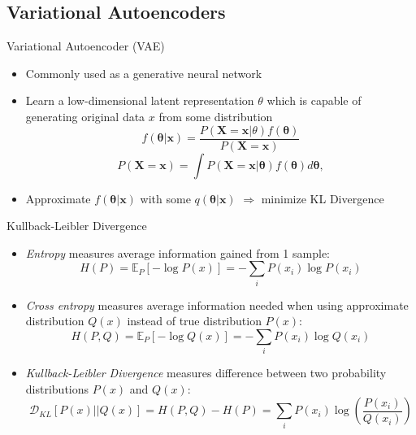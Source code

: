 \documentclass{beamer}
\theoremstyle{definition}
\begin{document}
\subsection{Variational Autoencoders}
\begin{frame}{Variational Autoencoder (VAE)}
\begin{itemize}
\item Commonly used as a generative neural network
\item Learn a low-dimensional latent representation $\theta$ which is capable of generating original data $x$ from some distribution
\[
f(\boldsymbol{\theta} | \boldsymbol{x})=\frac{P(\boldsymbol{X}=\boldsymbol{x}| \theta) f(\boldsymbol{\theta})}{P(\boldsymbol{X}=\boldsymbol{x})}
\]
\begin{equation}\label{marginal}
{P(\boldsymbol{X}=\boldsymbol{x})=\int P(\boldsymbol{X}=\boldsymbol{x}| \boldsymbol{\theta}) f(\boldsymbol{\theta})d\boldsymbol{\theta}},\nonumber
\end{equation}
\item<2-> Approximate $f(\boldsymbol{\theta} | \boldsymbol{x})$ with some $q(\boldsymbol{\theta} | \boldsymbol{x})$ $\Rightarrow$ minimize KL Divergence
\end{itemize}
\end{frame}

\begin{frame}{Kullback-Leibler Divergence}
\begin{itemize}
  \item<1-> \textit{Entropy} measures average information gained from 1 sample:
  \[H(P) = \mathbb{E}_P[-\log P(x)] =  - \sum_i P(x_i) \log P(x_i)\]
  \item<2-> \textit{Cross entropy} measures average information needed when using approximate distribution $Q(x)$ instead of true distribution $P(x)$:
  \[H(P,Q) = \mathbb{E}_P[-\log Q(x)] = -\sum_i P(x_i) \log Q(x_i)\]
  \item<3-> \textit{Kullback-Leibler Divergence} measures difference between two probability distributions $P(x)$ and $Q(x)$:
\[\mathcal{D}_{KL} \left[ P(x) || Q(x) \right] = H(P,Q) - H(P) = \sum_i P(x_i) \log \left(\frac{P(x_i)}{Q(x_i)} \right)\]
\end{itemize}
\end{frame}
\end{document}
